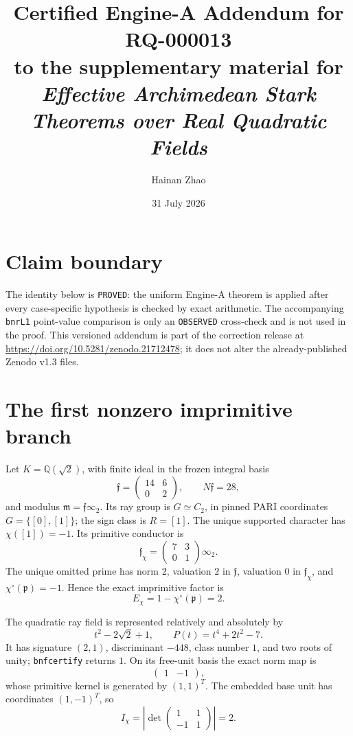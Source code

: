 \documentclass[11pt]{article}
\title{Certified Engine-A Addendum for RQ-000013\\
\large to the supplementary material for\\
\emph{Effective Archimedean Stark Theorems over Real Quadratic Fields}}
\author{Hainan Zhao}
\date{31 July 2026}
\newcommand{\Q}{\mathbb Q}
\begin{document}
\maketitle

\section*{Claim boundary}

The identity below is \texttt{PROVED}: the uniform Engine-A theorem is
applied after every case-specific hypothesis is checked by exact
arithmetic.  The accompanying \texttt{bnrL1} point-value comparison is
only an \texttt{OBSERVED} cross-check and is not used in the proof.
This versioned addendum is part of the correction release at
\url{https://doi.org/10.5281/zenodo.21712478}; it does not alter the
already-published Zenodo v1.3 files.

\section*{The first nonzero imprimitive branch}

Let \(K=\Q(\sqrt2)\), with finite ideal in the frozen integral basis
\[
 \mathfrak f=\begin{pmatrix}14&6\\0&2\end{pmatrix},
 \qquad N\mathfrak f=28,
\]
and modulus \(\mathfrak m=\mathfrak f\infty_2\).  Its ray group is
\(G\simeq C_2\), in pinned PARI coordinates \(G=\{[0],[1]\}\);
the sign class is \(R=[1]\).  The unique supported character has
\(\chi([1])=-1\).  Its primitive conductor is
\[
 \mathfrak f_\chi=\begin{pmatrix}7&3\\0&1\end{pmatrix}\infty_2.
\]
The unique omitted prime has norm \(2\), valuation \(2\) in
\(\mathfrak f\), valuation \(0\) in \(\mathfrak f_\chi\), and
\(\chi^\circ(\mathfrak p)=-1\).  Hence the exact imprimitive factor is
\[
 E_\chi=1-\chi^\circ(\mathfrak p)=2.
\]

The quadratic ray field is represented relatively and absolutely by
\[
 t^2-2\sqrt2+1,\qquad P(t)=t^4+2t^2-7.
\]
It has signature \((2,1)\), discriminant \(-448\), class number \(1\),
and two roots of unity; \texttt{bnfcertify} returns \(1\).
On its free-unit basis the exact norm map is
\[
 \begin{pmatrix}1&-1\end{pmatrix},
\]
whose primitive kernel is generated by \((1,1)^T\).  The embedded base
unit has coordinates \((1,-1)^T\), so
\[
 I_\chi=\left|\det
 \begin{pmatrix}1&1\\-1&1\end{pmatrix}\right|=2.
\]
\end{document}
